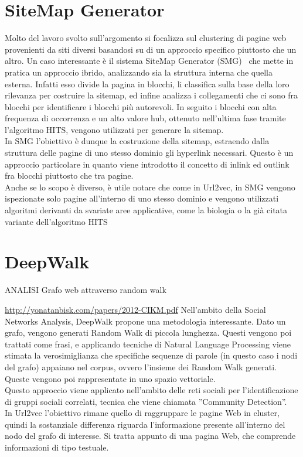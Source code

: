 \section{SiteMap Generator}
Molto del lavoro svolto sull'argomento si focalizza sul clustering di pagine web provenienti da siti diversi basandosi su di un approccio specifico piuttosto che un altro. Un caso interessante è il sistema SiteMap Generator (SMG)~\cite{Lin11} che mette in pratica un approccio ibrido, analizzando sia la struttura interna che quella esterna. Infatti esso divide la pagina in blocchi, li classifica sulla base della loro rilevanza per costruire la sitemap, ed infine analizza i collegamenti che ci sono fra blocchi per identificare i blocchi più autorevoli. In seguito i blocchi con alta frequenza di occorrenza e un alto valore hub, ottenuto nell'ultima fase tramite l'algoritmo HITS, vengono utilizzati per generare la sitemap.
\\
In SMG l'obiettivo è dunque la costruzione della sitemap, estraendo dalla struttura delle pagine di uno stesso dominio gli hyperlink necessari. Questo è un approccio particolare in quanto viene introdotto il concetto di inlink ed outlink fra blocchi piuttosto che tra pagine. 
\\
Anche se lo scopo è diverso, è utile notare che come in Url2vec, in SMG vengono ispezionate solo pagine all'interno di uno stesso dominio e vengono utilizzati algoritmi derivanti da svariate aree applicative, come la biologia o la già citata variante dell'algoritmo HITS \cite{Kleinberg99}

\section{DeepWalk}
ANALISI Grafo web attraverso random walk

\url{http://yonatanbisk.com/papers/2012-CIKM.pdf} 
Nell'ambito della Social Networks Analysis, DeepWalk \cite{Perozzi14} propone una metodologia interessante. Dato un grafo, vengono generati Random Walk di piccola lunghezza. Questi vengono poi trattati come frasi, e applicando tecniche di Natural Language Processing viene stimata la verosimiglianza che specifiche sequenze di parole (in questo caso i nodi del grafo) appaiano nel corpus, ovvero l'insieme dei Random Walk generati. Queste vengono poi rappresentate in uno spazio vettoriale.
\\
Questo approccio viene applicato nell'ambito delle reti sociali per l'identificazione di gruppi sociali correlati, tecnica che viene chiamata ''Community Detection''.
\\
In Url2vec l'obiettivo rimane quello di raggruppare le pagine Web in cluster, quindi la sostanziale differenza riguarda l'informazione presente all'interno del nodo del grafo di interesse. Si tratta appunto di una pagina Web, che comprende informazioni di tipo testuale. 
